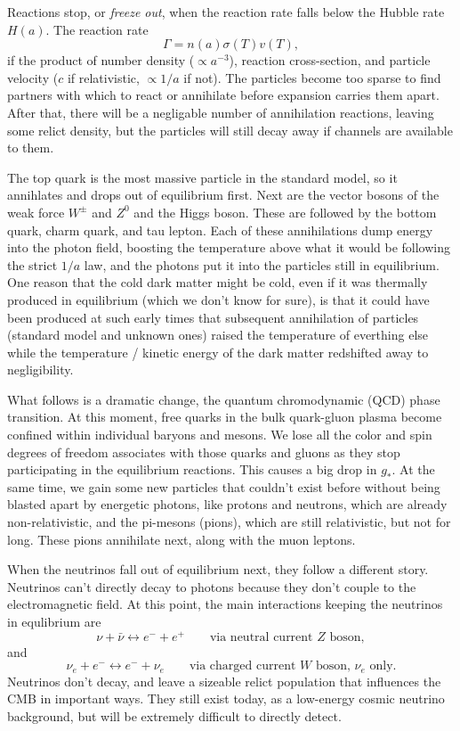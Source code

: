Reactions stop, or \textit{freeze out}, when the reaction rate falls below the Hubble rate $H(a)$.  The reaction rate
\begin{equation}
  \Gamma = n(a) \sigma(T) v(T),
\end{equation}
if the product of number density ($\propto a^{-3}$), reaction cross-section, and particle velocity ($c$ if relativistic, $\propto 1/a$ if not).  The particles become too sparse to find partners with which to react or annihilate before expansion carries them apart.  After that, there will be a negligable number of annihilation reactions, leaving some relict density, but the particles will still decay away if channels are available to them.

The top quark is the most massive particle in the standard model, so it annihlates and drops out of equilibrium first.  Next are the vector bosons of the weak force $W^\pm$ and  $Z^0$ and the Higgs boson.  These are followed by the bottom quark, charm quark, and tau lepton.  Each of these annihilations dump energy into the photon field, boosting the temperature above what it would be following the strict $1/a$ law, and the photons put it into the particles still in equilibrium.  One reason that the cold dark matter might be cold, even if it was thermally produced in equilibrium (which we don't know for sure), is that it could have been produced at such early times that subsequent annihilation of particles (standard model and unknown ones) raised the temperature of everthing else while the temperature / kinetic energy of the dark matter redshifted away to negligibility.

What follows is a dramatic change, the quantum chromodynamic (QCD) phase transition.  At this moment, free quarks in the bulk quark-gluon plasma become confined within individual baryons and mesons.  We lose all the color and spin degrees of freedom associates with those quarks and gluons as they stop participating in the equilibrium reactions.  This causes a big drop in $g_*$.  At the same time, we gain some new particles that couldn't exist before without being blasted apart by energetic photons, like protons and neutrons, which are already non-relativistic, and the pi-mesons (pions), which are still relativistic, but not for long.  These pions annihilate next, along with the muon leptons.

When the neutrinos fall out of equilibrium next, they follow a different story. Neutrinos can't directly decay to photons because they don't couple to the electromagnetic field.   At this point, the main interactions keeping the neutrinos in equlibrium are
\begin{equation}
  \nu + \bar \nu \leftrightarrow e^- + e^+   \qquad \mbox{via neutral current $Z$ boson},
\end{equation}
and
\begin{equation}
  \nu_e + e^- \leftrightarrow e^- + \nu_e   \qquad \mbox{via charged current $W$ boson, $\nu_e$ only}.
\end{equation}
Neutrinos don't decay, and leave a sizeable relict population that influences the CMB in important ways.  They still exist today, as a low-energy cosmic neutrino background, but will be extremely difficult to directly detect.

